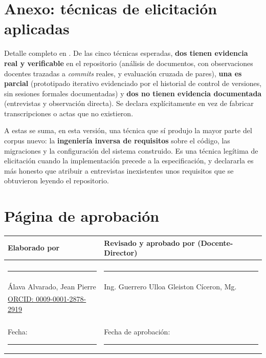 \documentclass[11pt,a4paper]{article}
\DeclareRobustCommand{\cd}[1]{\texttt{\protect\seqsplit{#1}}}
\begin{document}
\section{Anexo: técnicas de elicitación aplicadas}

Detalle completo en \cd{docs/requisitos/elicitacion/README.md}. De las cinco técnicas esperadas,
\textbf{dos tienen evidencia real y verificable} en el repositorio (análisis de documentos, con
observaciones docentes trazadas a \emph{commits} reales, y evaluación cruzada de pares),
\textbf{una es parcial} (prototipado iterativo evidenciado por el historial de control de
versiones, sin sesiones formales documentadas) y \textbf{dos no tienen evidencia documentada}
(entrevistas y observación directa). Se declara explícitamente en vez de fabricar transcripciones
o actas que no existieron.

A estas se suma, en esta versión, una técnica que sí produjo la mayor parte del corpus nuevo: la
\textbf{ingeniería inversa de requisitos} sobre el código, las migraciones y la configuración del
sistema construido. Es una técnica legítima de elicitación cuando la implementación precede a la
especificación, y declararla es más honesto que atribuir a entrevistas inexistentes unos
requisitos que se obtuvieron leyendo el repositorio.

\section{Página de aprobación}

\begin{center}
\begin{tabular}{p{7cm} p{7cm}}
\toprule
\textbf{Elaborado por} & \textbf{Revisado y aprobado por (Docente-Director)} \\
\midrule
& \\[1.6cm]
\rule{6cm}{0.4pt} & \rule{6cm}{0.4pt} \\
Álava Alvarado, Jean Pierre & Ing. Guerrero Ulloa Gleiston Cíceron, Mg. \\
\href{https://orcid.org/0009-0001-2878-2919}{ORCID: 0009-0001-2878-2919} & \\
\vspace{0.5cm} & \\
Fecha: \rule{4cm}{0.4pt} & Fecha de aprobación: \rule{4cm}{0.4pt} \\
\bottomrule
\end{tabular}
\end{center}

\vspace{0.4cm}
\noindent{}
\end{document}
